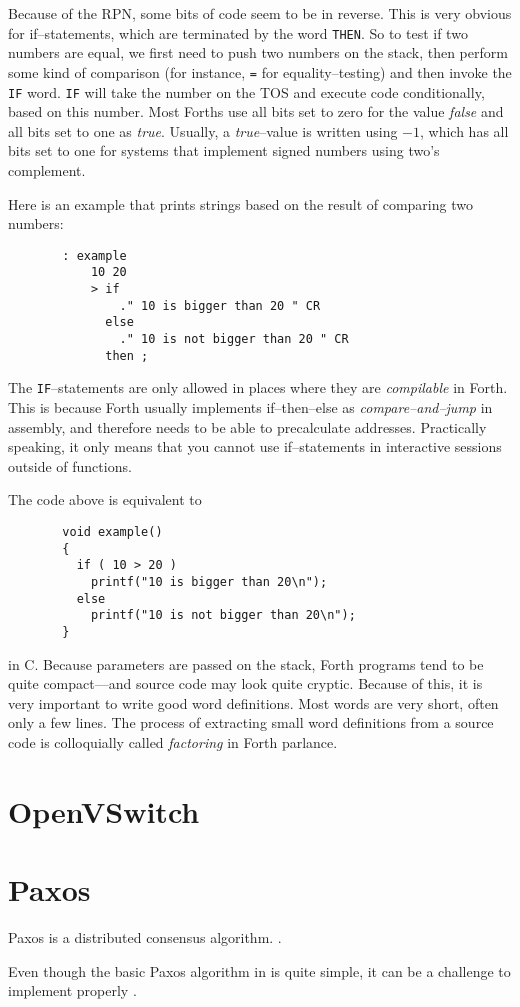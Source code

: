 Because of the \ac{RPN}, some bits of code seem to be in reverse.  This is
very obvious for if--statements, which are terminated by the word
\texttt{THEN}.  So to test if two numbers are equal, we first need to push
two numbers on the stack, then perform some kind of comparison (for
instance, \texttt{=} for equality--testing) and then invoke the
\texttt{IF} word.  \texttt{IF} will take the number on the \ac{TOS}
and execute code conditionally, based on this number.  Most Forths use all
bits set to zero for the value \textit{false} and all bits set to one as
\textit{true}.  Usually, a \textit{true}--value is written using $-1$,
which has all bits set to one for systems that implement signed numbers
using two's complement.

Here is an example that prints strings based on the result of comparing two
numbers:

\begin{figure}[H]
  \centering
  \begin{Verbatim}
  : example
      10 20
      > if
          ." 10 is bigger than 20 " CR
        else
          ." 10 is not bigger than 20 " CR
        then ;
  \end{Verbatim}
\end{figure}

The \texttt{IF}--statements are only allowed in places where they are
\textit{compilable} in Forth. This is because Forth usually implements
if--then--else as \textit{compare--and--jump} in assembly, and therefore
needs to be able to precalculate addresses.  Practically speaking, it only
means that you cannot use if--statements in interactive sessions outside of
functions.

The code above is equivalent to

\begin{figure}[H]
  \centering
  \begin{Verbatim}
  void example()
  {
    if ( 10 > 20 )
      printf("10 is bigger than 20\n");
    else
      printf("10 is not bigger than 20\n");
  }
  \end{Verbatim}
\end{figure}

in C.  Because parameters are passed on the stack, Forth programs tend to be
quite compact---and source code may look quite cryptic.  Because of this, it
is very important to write good word definitions.  Most words are very
short, often only a few lines.  The process of extracting small word
definitions from a source code is colloquially called \textit{factoring} in
Forth parlance.

\section{OpenVSwitch}

\section{Paxos}
Paxos is a distributed consensus algorithm.
.

Even though the basic Paxos algorithm in \cite{Lam01} is quite simple, it can be
a challenge to implement properly \cite{Chandra:2007:PML:1281100.1281103}.
